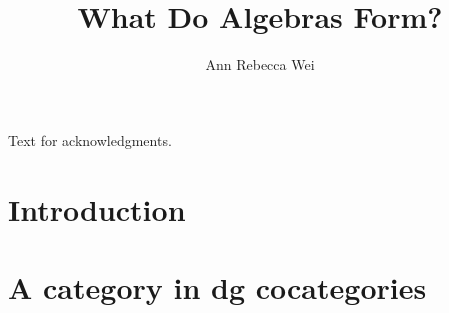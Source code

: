 \documentclass[12pt]{nuthesis} %
\author{Ann Rebecca Wei}
\title{What Do Algebras Form?}
\theoremstyle{definition}
\theoremstyle{remark}
\theoremstyle{example}
\begin{document}

\frontmatter		%
\maketitle		%

\abstract		%


\acknowledgements	%
Text for acknowledgments.




\nomenclature %


%
%
\clearpage{} %
\tableofcontents	%





\mainmatter             %

\chapter{Introduction}
	

\chapter{A category in dg cocategories}
	
	
	

\begin{singlespace}
\clearpage{} %

\end{singlespace}

\appendix		%



\end{document}

